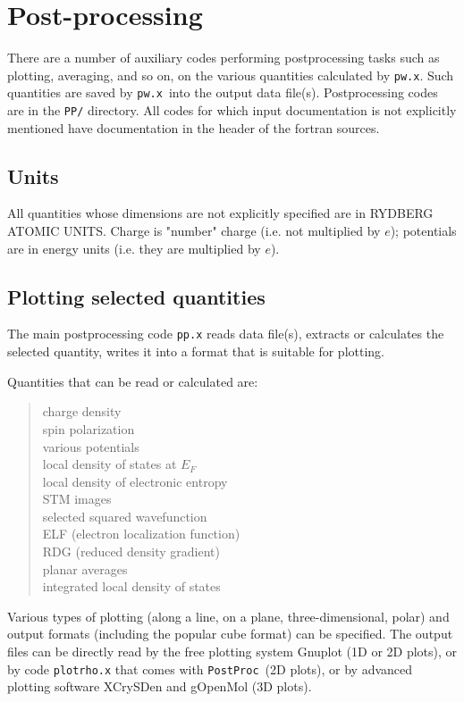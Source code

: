 \documentclass[12pt,a4paper]{article}
\def\pwx{\texttt{pw.x}}
\def\PostProc{\texttt{PostProc}}
\begin{document}
\section{Post-processing}

There are a number of auxiliary codes performing postprocessing tasks such
as plotting, averaging, and so on, on the various quantities calculated by
\pwx. Such quantities are saved by \pwx\ into the output data file(s). 
Postprocessing codes are in the \texttt{PP/} directory. All codes for 
which input documentation is not explicitly mentioned have documentation
in the header of the fortran sources.

\subsection{Units}

All quantities whose dimensions are not explicitly specified are in
RYDBERG ATOMIC UNITS. Charge is "number" charge (i.e. not multiplied 
by $e$); potentials are in energy units (i.e. they are multiplied by 
$e$).

\subsection{Plotting selected quantities}
  
The main postprocessing code \texttt{pp.x} reads data file(s), extracts or calculates 
the selected quantity, writes it into a format that is suitable for plotting.

Quantities that can be read or calculated are:
\begin{quote}
      charge density\\
      spin polarization\\
      various potentials\\
      local density of states at $E_F$\\
      local density of electronic entropy\\
      STM images\\
      selected squared wavefunction\\
      ELF (electron localization function)\\
      RDG (reduced density gradient)\\
      planar averages\\
      integrated local density of states
\end{quote}
Various types of plotting (along a line, on a plane, three-dimensional, polar)
and output formats (including the popular cube format) can be specified.
The output files can be directly read by the free plotting system Gnuplot
(1D or 2D plots), or by code \texttt{plotrho.x} that comes with \PostProc\ (2D plots),
or by advanced plotting software XCrySDen and gOpenMol (3D plots).
\end{document}
